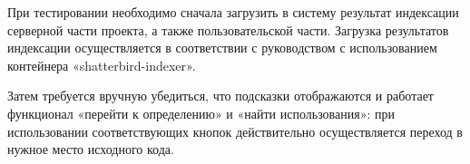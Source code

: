     При тестировании необходимо сначала загрузить в систему результат индексации серверной части проекта, а также пользовательской части. Загрузка результатов индексации осуществляется в соответствии с руководством с использованием контейнера «shatterbird-indexer».
    
    Затем требуется вручную убедиться, что подсказки отображаются и работает функционал «перейти к определению» и «найти использования»: при использовании соответствующих кнопок действительно осуществляется переход в нужное место исходного кода.
    

\clearpage